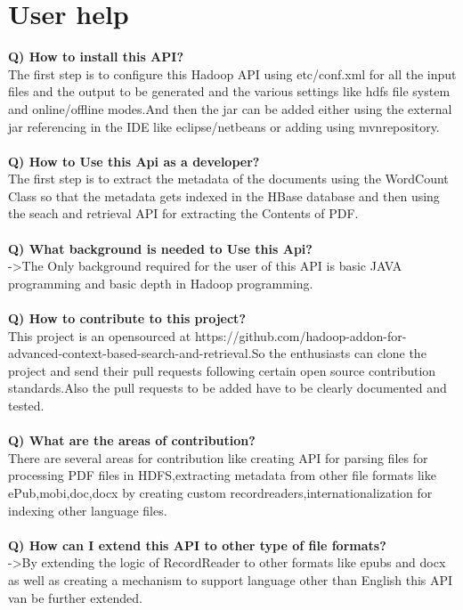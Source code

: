 \documentclass[oneside,a4paper,12pt]{report}
\begin{document}
{\section{User help}
\noindent\textbf{Q) How to install this API?}\\
The first step is to configure this Hadoop API using etc/conf.xml for all the input files and the output to be generated and the various settings like hdfs file system and online/offline modes.And then the jar can be added either using the external jar referencing in the IDE like eclipse/netbeans or adding using mvnrepository.\\\\

\noindent\textbf{Q) How to Use this Api as a developer?}\\
The first step is to extract the metadata of the documents using the WordCount Class so that the metadata gets indexed in the HBase database and then using the seach and retrieval API for extracting the Contents of PDF.\\\\

\noindent\textbf{Q) What background is needed to Use this Api?}\\
->The Only background required for the user of this API is basic JAVA programming and basic depth in Hadoop programming.\\\\

\noindent\textbf{Q) How to contribute to this project?}\\
This project is an opensourced at https://github.com/hadoop-addon-for-advanced-context-based-search-and-retrieval.So the enthusiasts can clone the project and send their pull requests following certain open source contribution standards.Also the pull requests to be added have to be clearly documented and tested.\\\\

\noindent\textbf{Q) What are the areas of contribution?}\\
There are several areas for contribution like creating API for parsing files for processing PDF files in HDFS,extracting metadata from other file formats like ePub,mobi,doc,docx by creating custom recordreaders,internationalization for indexing other language files.\\\\

\noindent\textbf{Q) How can I extend this API to other type of file formats?}\\
->By extending the logic of RecordReader to other formats like epubs and docx as well as creating a mechanism to support language other than English this API van be further extended.\\\\

}
\end{document}
